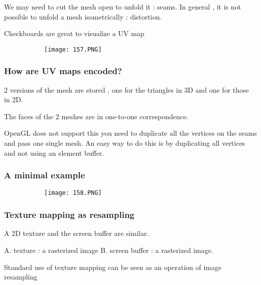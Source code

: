 \documentclass{article}
\begin{document}
We may need to cut the mesh open to unfold it : seams.
In general , it is not possible to unfold a mesh isometrically : distortion.

Checkboards are great to visualize a UV map


\begin{figure}[ht!]
  \centering
  \begin{subfigure}[b]{0.4\linewidth}
    \texttt{[image: 157.PNG]}
  \end{subfigure}
\end{figure}

\subsubsection{How are UV maps encoded?}

2 versions of the mesh are stored , one for the triangles in 3D and one for those in 2D.

The faces of the 2 meshes are in one-to-one correspondence.

OpenGL does not support this you need to duplicate all the vertices on the seams and pass one single mesh. An easy way to do this is by duplicating all vertices and not using an element buffer.

\vspace{60mm}
\subsubsection{A minimal example}

\begin{figure}[ht!]
  \centering
  \begin{subfigure}[b]{0.4\linewidth}
    \texttt{[image: 158.PNG]}
  \end{subfigure}
\end{figure}




\subsubsection{Texture mapping as resampling}

A 2D texture and the screen buffer are similar.

A. texture : a rasterized image 
B. screen buffer : a rasterized image.

Standard use of texture mapping can be seen as an operation of image resampling 
\end{document}
